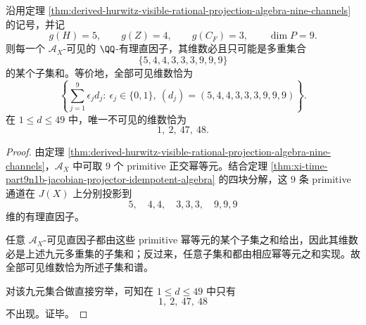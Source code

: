 \begin{corollary}[可见有理直因子维数的子集和谱]\label{cor:derived-hurwitz-visible-rational-factor-dimension-subsetsums}
沿用定理 \ref{thm:derived-hurwitz-visible-rational-projection-algebra-nine-channels} 的记号，并记
\[
g(H)=5,\qquad g(Z)=4,\qquad g(C_F)=3,\qquad \dim P=9.
\]
则每一个 \(\mathcal A_X\)-可见的 \(\QQ\)-有理直因子，其维数必且只可能是多重集合
\[
\{5,4,4,3,3,3,9,9,9\}
\]
的某个子集和。等价地，全部可见维数恰为
\[
\left\{
\sum_{j=1}^{9}\epsilon_j d_j:\ \epsilon_j\in\{0,1\},\
(d_j)=(5,4,4,3,3,3,9,9,9)
\right\}.
\]
在 \(1\le d\le 49\) 中，唯一不可见的维数恰为
\[
1,\ 2,\ 47,\ 48.
\]
\end{corollary}
\begin{proof}
由定理 \ref{thm:derived-hurwitz-visible-rational-projection-algebra-nine-channels}，\(\mathcal A_X\) 中可取 \(9\) 个 primitive 正交幂等元。结合定理 \ref{thm:xi-time-part9n1b-jacobian-projector-idempotent-algebra} 的四块分解，这 \(9\) 条 primitive 通道在 \(J(X)\) 上分别投影到
\[
5,\quad 4,4,\quad 3,3,3,\quad 9,9,9
\]
维的有理直因子。

任意 \(\mathcal A_X\)-可见直因子都由这些 primitive 幂等元的某个子集之和给出，因此其维数必是上述九元多重集的子集和；反过来，任意子集和都由相应幂等元之和实现。故全部可见维数恰为所述子集和谱。

对该九元集合做直接穷举，可知在 \(1\le d\le 49\) 中只有
\[
1,\ 2,\ 47,\ 48
\]
不出现。证毕。
\end{proof}

\endinput

